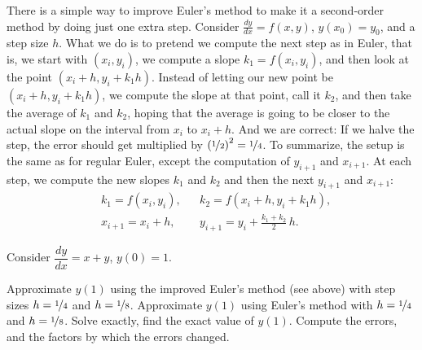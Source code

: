 There is a simple way to improve Euler's method to make it a
second-order method by doing just one extra step.
Consider $\frac{dy}{dx}=f(x,y)$, $y(x_0) = y_0$,
and a step size $h$.
What we do is to pretend we compute the next step as in Euler,
that is, we start with $(x_i,y_i)$, we compute a
slope $k_1 = f(x_i,y_i)$, and then look at the point $(x_i+h,y_i + k_1h)$.
Instead of letting our new point be $(x_i+h,y_i + k_1h)$, we compute
the slope at that point, call it $k_2$, and then take the average
of $k_1$ and $k_2$, hoping that the average is going to be closer to
the actual slope on the interval from $x_i$ to $x_i+h$.  And we are correct:
If we halve the step, the error should get multiplied by
${(\nicefrac{1}{2})}^2 = \nicefrac{1}{4}$.
To summarize, the setup is the
same as for regular Euler, except
the computation of $y_{i+1}$ and $x_{i+1}$.
At each step, we compute the new slopes $k_1$ and $k_2$ and then the next
$y_{i+1}$ and $x_{i+1}$:
\begin{align*}
& k_1 = f(x_i,y_i) ,
&
& k_2 = f(x_i + h,y_i + k_1h) ,
\\
& x_{i+1} = x_i + h ,
&
& y_{i+1} = y_i + \frac{k_1+k_2}{2}\,h .
\end{align*}


\begin{exercise}
Consider $\dfrac{dy}{dx} = x+y$, $y(0)=1$.
\begin{tasks}
\task Approximate $y(1)$ using the improved Euler's method (see above) with
step sizes $h=\nicefrac{1}{4}$ and $h=\nicefrac{1}{8}$.
\task Approximate $y(1)$ using Euler's method with
$h=\nicefrac{1}{4}$ and $h=\nicefrac{1}{8}$.
\task Solve exactly, find the exact value of
$y(1)$.
\task Compute the errors, and the factors by which the errors changed.
\end{tasks}
\end{exercise}


